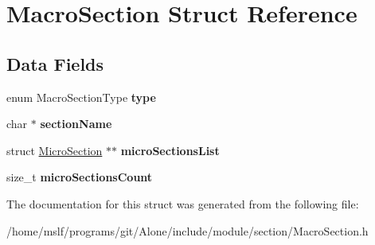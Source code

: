\hypertarget{struct_macro_section}{}\section{Macro\+Section Struct Reference}
\label{struct_macro_section}
\subsection*{Data Fields}
\begin{DoxyCompactItemize}
\item 
\hypertarget{struct_macro_section_a1f40d85e4ee917a320fd30b76d034fe5}{}\label{struct_macro_section_a1f40d85e4ee917a320fd30b76d034fe5} 
enum Macro\+Section\+Type {\bfseries type}
\item 
\hypertarget{struct_macro_section_a7dadb8f2b7c0ffb34931b35b5af02e99}{}\label{struct_macro_section_a7dadb8f2b7c0ffb34931b35b5af02e99} 
char $\ast$ {\bfseries section\+Name}
\item 
\hypertarget{struct_macro_section_a1588ef9acf9b8a267707434cb07e05a4}{}\label{struct_macro_section_a1588ef9acf9b8a267707434cb07e05a4} 
struct \hyperlink{struct_micro_section}{Micro\+Section} $\ast$$\ast$ {\bfseries micro\+Sections\+List}
\item 
\hypertarget{struct_macro_section_a11d3c23aad59b0fefc3db454777b9713}{}\label{struct_macro_section_a11d3c23aad59b0fefc3db454777b9713} 
size\+\_\+t {\bfseries micro\+Sections\+Count}
\end{DoxyCompactItemize}


The documentation for this struct was generated from the following file\+:\begin{DoxyCompactItemize}
\item 
/home/mslf/programs/git/\+Alone/include/module/section/Macro\+Section.\+h\end{DoxyCompactItemize}
